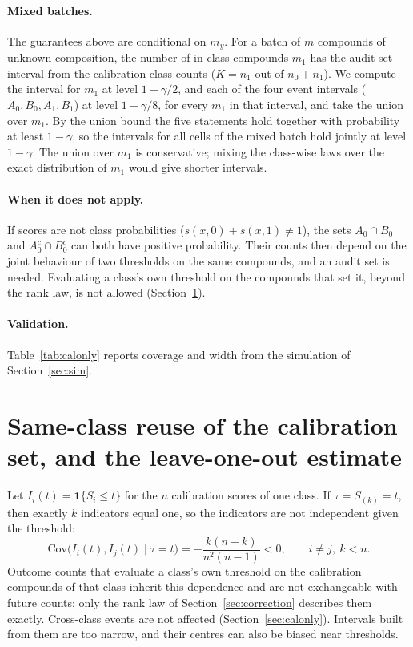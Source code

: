 \documentclass[10pt]{article}
\begin{document}
\paragraph{Mixed batches.} The guarantees above are conditional on $m_y$. For a batch of $m$ compounds of unknown composition, the number of in-class compounds $m_1$ has the audit-set interval from the calibration class counts ($K=n_1$ out of $n_0+n_1$). We compute the interval for $m_1$ at level $1-\gamma/2$, and each of the four event intervals ($A_0,B_0,A_1,B_1$) at level $1-\gamma/8$, for every $m_1$ in that interval, and take the union over $m_1$. By the union bound the five statements hold together with probability at least $1-\gamma$, so the intervals for all cells of the mixed batch hold jointly at level $1-\gamma$. The union over $m_1$ is conservative; mixing the class-wise laws over the exact distribution of $m_1$ would give shorter intervals.

\paragraph{When it does not apply.} If scores are not class probabilities ($s(x,0)+s(x,1)\ne1$), the sets $A_0\cap B_0$ and $A_0^c\cap B_0^c$ can both have positive probability. Their counts then depend on the joint behaviour of two thresholds on the same compounds, and an audit set is needed. Evaluating a class's own threshold on the compounds that set it, beyond the rank law, is not allowed (Section~\ref{sec:reuse}).

\paragraph{Validation.} Table~\ref{tab:calonly} reports coverage and width from the simulation of Section~\ref{sec:sim}.



\section{Same-class reuse of the calibration set, and the leave-one-out estimate}
\label{sec:reuse}

Let $I_i(t)=\mathbf 1\{S_i\le t\}$ for the $n$ calibration scores of one class. If $\tau=S_{(k)}=t$, then exactly $k$ indicators equal one, so the indicators are not independent given the threshold:
\begin{equation}
\mathrm{Cov}\big(I_i(t),I_j(t)\mid\tau=t\big)=-\frac{k(n-k)}{n^2(n-1)}<0,\qquad i\ne j,\ k<n.
\end{equation}
Outcome counts that evaluate a class's own threshold on the calibration compounds of that class inherit this dependence and are not exchangeable with future counts; only the rank law of Section~\ref{sec:correction} describes them exactly. Cross-class events are not affected (Section~\ref{sec:calonly}). Intervals built from them are too narrow, and their centres can also be biased near thresholds.
\end{document}
